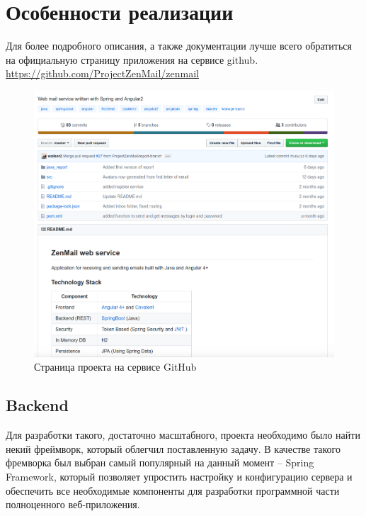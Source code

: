 \documentclass{article}
\begin{document}
\section{Особенности реализации}
Для более подробного описания, а также документации лучше всего обратиться на официальную страницу приложения на сервисе github.\\
\url{https://github.com/ProjectZenMail/zenmail}

\begin{figure}[H]
        \begin{flushleft}
            \centerline{\includegraphics[scale=0.6]{githubpage.png}}
            \caption{Страница проекта на сервисе GitHub}
        \end{flushleft}
\end{figure}

\subsection{Backend}
Для разработки такого, достаточно масштабного, проекта необходимо было найти некий фреймворк, который облегчил поставленную задачу. В качестве такого фремворка был выбран самый популярный на данный момент -- Spring Framework, который позволяет упростить настройку и конфигурацию сервера и обеспечить все необходимые компоненты для разработки программной части полноценного веб-приложения. \\
\end{document}
